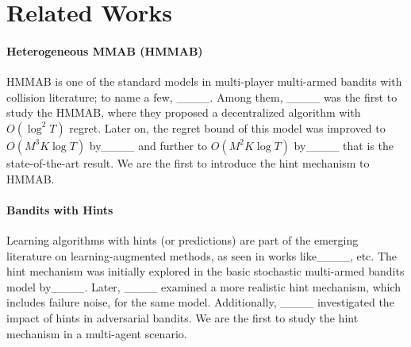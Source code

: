 \section{Related Works}
\paragraph{Heterogeneous MMAB (HMMAB)}
HMMAB is one of the standard models in multi-player multi-armed bandits with collision literature; to name a few, ____.
Among them, ____ was the first to study the HMMAB, where they proposed a decentralized algorithm with $O(\log^2 T)$ regret.
Later on, the regret bound of this model was improved to \(O(M^3K\log T)\) by____ and further to \(O(M^2K\log T)\) by____ that is the state-of-the-art result.
We are the first to introduce the hint mechanism to HMMAB.


\paragraph{Bandits with Hints}
Learning algorithms with hints (or predictions) are part of the emerging literature on learning-augmented methods, as seen in works like____, etc. The hint mechanism was initially explored in the basic stochastic multi-armed bandits model by____. Later, ____ examined a more realistic hint mechanism, which includes failure noise, for the same model. Additionally, ____ investigated the impact of hints in adversarial bandits. We are the first to study the hint mechanism in a multi-agent scenario.



